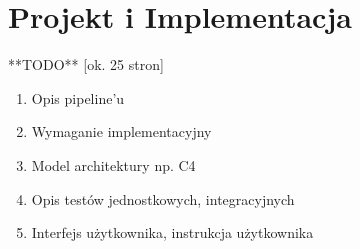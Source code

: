 \clearpage
\section{Projekt i Implementacja}

**TODO** [ok. 25 stron]

\begin{enumerate}
    \item Opis pipeline'u
    \item Wymaganie implementacyjny
    \item Model architektury np. C4
    \item Opis testów jednostkowych, integracyjnych
    \item Interfejs użytkownika, instrukcja użytkownika
\end{enumerate}